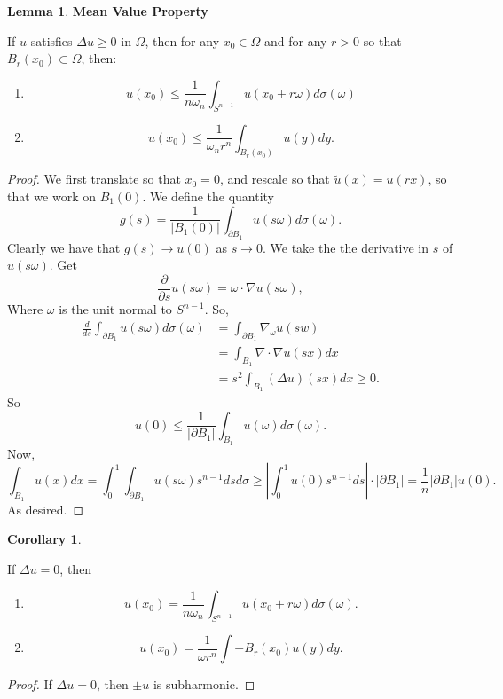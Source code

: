 \documentclass[12pt, a4paper]{article}
\theoremstyle{definition}
\newtheorem{lemma}{Lemma}
\newtheorem{cor}{Corollary}
\newcommand{\bd}{\partial}
\newcommand{\grad}{\nabla}
\begin{document}
\begin{tcolorbox}
\begin{lemma}
	\textbf{Mean Value Property}
\end{lemma}
If $u$ satisfies $\Delta u \geq 0$ in $\Omega$, then for any $x_0 \in \Omega$ and for any $r>0$ so that $B_r(x_0) \subset \Omega$, then:
\begin{enumerate}[label = \roman*)]
	\item $$u(x_0) \leq \frac{ 1 }{ n \omega_n } \int_{S^{n-1}}u(x_0 + r\omega) d\sigma(\omega) $$
	\item $$ u(x_0) \leq \frac{ 1 }{ \omega_n r^n } \int_{B_r(x_0)} u(y) dy. $$ 
\end{enumerate}
\begin{proof}
	We first translate so that $x_0 = 0$, and rescale so that $\tilde{u}(x) = u(rx)$, so that we work on $B_1(0)$. We define the quantity 
	$$ g(s) = \frac{ 1 }{ |B_1(0)| } \int_{\bd B_1} u(s\omega) d \sigma(\omega). $$
	Clearly we have that $g(s) \to u(0)$ as $s \to 0$. We take the the derivative in $s$ of $u(s\omega)$. Get
	$$ \frac{ \partial  }{ \partial s } u(s \omega) = \omega \cdot \grad u (s\omega) , $$ 
Where $\omega$ is the unit normal to $S^{n-1}$. 
So,
\begin{align*}
	\frac{ d }{ ds } \int_{\bd B_1} u(s \omega ) d \sigma(\omega) & = \int_{\bd B_1} \grad_\omega u(sw) 
	\\ & = \int_{B_1} \grad \cdot \grad u(sx) dx \tag{Divergence Theorem}
	\\ &= s^2 \int_{B_1} \left( \Delta u \right) (sx) dx \geq 0.
\end{align*}
So 
	$$ u(0) \leq \frac{ 1 }{ |\bd B_1| } \int_{B_1} u(\omega) d \sigma(\omega). $$ 
Now, 
	$$ \int_{B_1} u(x) dx = \int_0^1 \int_{\bd B_1} u(s\omega) s^{n-1} ds d\sigma \geq \left| \int_0^1 u(0) s^{n-1} ds \right| \cdot |\bd B_1| = \frac{ 1 }{ n  } |\bd B_1| u(0). $$ 
As desired. 
\end{proof}
\end{tcolorbox}
\begin{tcolorbox}
\begin{cor}
\end{cor}
If $\Delta u =0$, then 
\begin{enumerate}[label = \roman*)]
	\item $$ u(x_0) = \frac{ 1 }{ n \omega_n } \int_{S^{n-1}} u(x_0 + r \omega) d \sigma(\omega). $$
	\item  $$ u(x_0) = \frac{ 1 }{ \omega r^n } \int-{B_r(x_0)} u(y) dy. $$ 
\end{enumerate}
\begin{proof}
If $\Delta u = 0$, then $\pm u$ is subharmonic.
\end{proof}
\end{tcolorbox}
\end{document}
